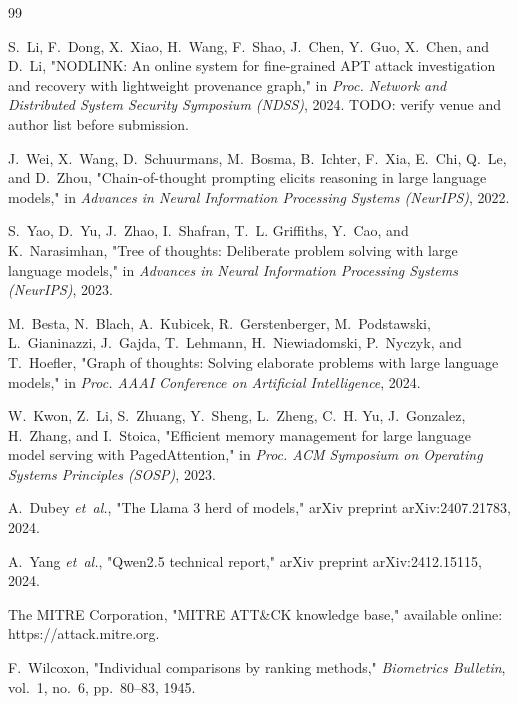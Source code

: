 \documentclass[a4paper, 12pt]{report}
\theoremstyle{definition}
\begin{document}
\newpage
\renewcommand{\bibname}{References}
\begin{thebibliography}{99}

S.~Li, F.~Dong, X.~Xiao, H.~Wang, F.~Shao, J.~Chen, Y.~Guo, X.~Chen, and D.~Li, "NODLINK: An online system for fine-grained APT attack investigation and recovery with lightweight provenance graph," in \textit{Proc. Network and Distributed System Security Symposium (NDSS)}, 2024. TODO: verify venue and author list before submission.

J.~Wei, X.~Wang, D.~Schuurmans, M.~Bosma, B.~Ichter, F.~Xia, E.~Chi, Q.~Le, and D.~Zhou, "Chain-of-thought prompting elicits reasoning in large language models," in \textit{Advances in Neural Information Processing Systems (NeurIPS)}, 2022.

S.~Yao, D.~Yu, J.~Zhao, I.~Shafran, T.~L. Griffiths, Y.~Cao, and K.~Narasimhan, "Tree of thoughts: Deliberate problem solving with large language models," in \textit{Advances in Neural Information Processing Systems (NeurIPS)}, 2023.

M.~Besta, N.~Blach, A.~Kubicek, R.~Gerstenberger, M.~Podstawski, L.~Gianinazzi, J.~Gajda, T.~Lehmann, H.~Niewiadomski, P.~Nyczyk, and T.~Hoefler, "Graph of thoughts: Solving elaborate problems with large language models," in \textit{Proc. AAAI Conference on Artificial Intelligence}, 2024.

W.~Kwon, Z.~Li, S.~Zhuang, Y.~Sheng, L.~Zheng, C.~H. Yu, J.~Gonzalez, H.~Zhang, and I.~Stoica, "Efficient memory management for large language model serving with PagedAttention," in \textit{Proc. ACM Symposium on Operating Systems Principles (SOSP)}, 2023.

A.~Dubey \textit{et~al.}, "The Llama 3 herd of models," arXiv preprint arXiv:2407.21783, 2024.

A.~Yang \textit{et~al.}, "Qwen2.5 technical report," arXiv preprint arXiv:2412.15115, 2024.

The MITRE Corporation, "MITRE ATT\&CK knowledge base," available online: https://attack.mitre.org.

F.~Wilcoxon, "Individual comparisons by ranking methods," \textit{Biometrics Bulletin}, vol.~1, no.~6, pp.~80--83, 1945.

\end{thebibliography}
\end{document}
